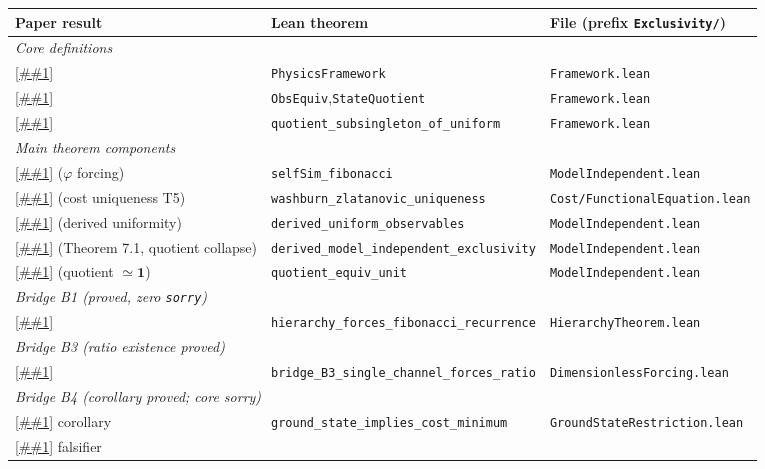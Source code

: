 \documentclass[11pt]{article}
\providecommand{\cref}[1]{\ref{##1}}%
\theoremstyle{definition}
\theoremstyle{remark}
\begin{document}
\begin{center}
\renewcommand{\arraystretch}{1.2}
\small
\begin{tabular}{p{3.4cm}p{3.2cm}p{5.0cm}}
\hline
\textbf{Paper result} & \textbf{Lean theorem} & \textbf{File (prefix \texttt{Exclusivity/})} \\
\hline
\multicolumn{3}{l}{\textit{Core definitions}} \\
\cref{def:framework} &
  \texttt{PhysicsFramework} &
  \texttt{Framework.lean} \\
\cref{def:obs-equiv,def:quotient} &
  \texttt{ObsEquiv},\;\texttt{StateQuotient} &
  \texttt{Framework.lean} \\
\cref{lem:uniform-collapse} &
  \texttt{quotient\_subsingleton\_of\_uniform} &
  \texttt{Framework.lean} \\[4pt]
\multicolumn{3}{l}{\textit{Main theorem components}} \\
\cref{thm:phi} ($\varphi$ forcing) &
  \texttt{selfSim\_fibonacci} &
  \texttt{ModelIndependent.lean} \\
\cref{thm:t5} (cost uniqueness T5) &
  \texttt{washburn\_zlatanovic\_uniqueness} &
  \texttt{Cost/FunctionalEquation.lean} \\
\cref{thm:derived-uniform} (derived uniformity) &
  \texttt{derived\_uniform\_observables} &
  \texttt{ModelIndependent.lean} \\
\cref{thm:main} (Theorem 7.1, quotient collapse) &
  \texttt{derived\_model\_independent\_exclusivity} &
  \texttt{ModelIndependent.lean} \\
\cref{cor:equiv} (quotient $\simeq \mathbf{1}$) &
  \texttt{quotient\_equiv\_unit} &
  \texttt{ModelIndependent.lean} \\[4pt]
\multicolumn{3}{l}{\textit{Bridge B1 (proved, zero \texttt{sorry})}} \\
\cref{sec:bridge-b1} &
  \texttt{hierarchy\_forces\_fibonacci\_recurrence} &
  \texttt{HierarchyTheorem.lean} \\[4pt]
\multicolumn{3}{l}{\textit{Bridge B3 (ratio existence proved)}} \\
\cref{sec:bridge-b3} &
  \texttt{bridge\_B3\_single\_channel\_forces\_ratio} &
  \texttt{DimensionlessForcing.lean} \\[4pt]
\multicolumn{3}{l}{\textit{Bridge B4 (corollary proved; core sorry)}} \\
\cref{sec:bridge-b4} corollary &
  \texttt{ground\_state\_implies\_cost\_minimum} &
  \texttt{GroundStateRestriction.lean} \\
\cref{sec:bridge-b4} falsifier &

\end{tabular}
\end{center}
\end{document}
